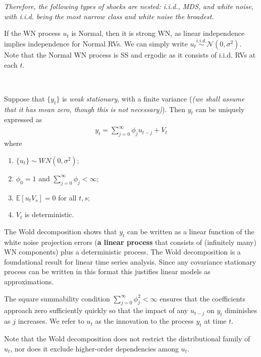 \textit{Therefore, the following types of shocks are nested: i.i.d., MDS, and white noise,
with i.i.d. being the most narrow class and white noise the broadest.}

If the WN process $u_t$ is Normal, then it is strong WN, as linear independence implies independence for Normal RVs.
We can simply write $u_t \overset{i.i.d.}{\sim} \mathcal{N}(0, \sigma^2)$.
Note that the Normal WN process is SS and ergodic as it consists of i.i.d. RVs at each $t$.

\begin{theorem}\label{thm:wolddecomp}
    \

    Suppose that $\{y_t\}$ is \textit{weak stationary}, with a finite variance (\textit{(we shall assume that it has mean zero, though this is not necessary)}).
    Then $y_t$ can be uniquely expressed as
    \begin{gather*}
        y_t = \sum_{j=0}^{\infty} \phi_j u_{t-j} + V_t 
    \end{gather*}
    where
    \begin{enumerate}
        \item $\{u_t\} \sim WN(0, \sigma^2)$;
        \item $\phi_0 = 1$ and $\sum_{j=0}^{\infty} \phi_j < \infty$;
        \item $\mathbb{E}[u_t V_s] = 0$ for all $t,s$;
        \item $V_t$ is deterministic.
    \end{enumerate}
\end{theorem}   

The Wold decomposition shows that $y_t$ can be written as a linear function of the white noise projection errors (\textbf{a linear process} that consists of (infinitely many) WN components) plus a deterministic process.
The Wold decomposition is a foundational result for linear time series analysis.
Since any covariance stationary process can be written in this format this justifies linear models as approximations.

The square summability condition $\sum_{j=0}^{\infty} \phi_j^2 < \infty$ ensures that the coefficients approach zero sufficiently quickly so that the impact of any $u_{t-j}$ on $y_t$ diminishes as $j$ increases.
We refer to $u_t$ as the innovation to the process $y_t$ at time $t$.

Note that the Wold decomposition does not restrict the distributional
family of $u_t$, nor does it exclude higher-order dependencies among $u_t$.

